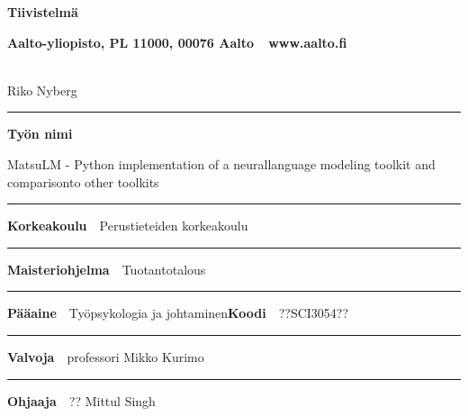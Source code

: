 \begin{spacing}{.88}

{\parindent0pt %

{\fontsize{13.9pt}{13.9pt}\selectfont
\vspace{-8.9mm}\hfill{\bfseries\sffamily\lsstyle Tiivistelmä}}

{\fontsize{9.48pt}{9.48pt}\selectfont
\vspace{.9mm}\hfill{\bfseries\sffamily\lsstyle Aalto-yliopisto, PL 11000, 00076 Aalto~~\textcolor{aaltoGray}{www.aalto.fi}}}

\\
{\small Riko Nyberg}

\vspace{-2.4mm}\rule{\textwidth}{.75pt}

{\fontsize{10.5pt}{10.5pt}\bfseries\sffamily\lsstyle Työn nimi}\\
\parbox[t]{\textwidth}{\raggedright\small MatsuLM - Python implementation of a neurallanguage modeling toolkit and comparisonto other toolkits}

\vspace{.5mm}\rule{\textwidth}{.75pt}

{\fontsize{10.5pt}{10.5pt}\bfseries\sffamily\lsstyle Korkeakoulu}~~{\small Perustieteiden korkeakoulu}

\vspace{-2.4mm}\rule{\textwidth}{.75pt}

{\fontsize{10.5pt}{10.5pt}\bfseries\sffamily\lsstyle Maisteriohjelma}~~{\small Tuotantotalous}

\vspace{-2.4mm}\rule{\textwidth}{.75pt}

{\fontsize{10.5pt}{10.5pt}\bfseries\sffamily\lsstyle Pääaine}~~{\small Työpsykologia ja johtaminen}\hfill{\fontsize{10.5pt}{10.5pt}\bfseries\sffamily\lsstyle Koodi}~~{\small ??SCI3054??}

\vspace{-2.4mm}\rule{\textwidth}{.75pt}

{\fontsize{10.5pt}{10.5pt}\bfseries\sffamily\lsstyle Valvoja}~~{\small professori Mikko Kurimo}

\vspace{-2.4mm}\rule{\textwidth}{.75pt}

{\fontsize{10.5pt}{10.5pt}\bfseries\sffamily\lsstyle Ohjaaja}~~{\small ?? Mittul Singh}

}
\end{spacing}
